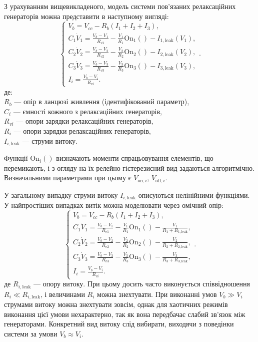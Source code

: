 З урахуванням вищевикладеного, модель системи пов'язаних
релаксаційних генераторів можна представити в наступному
вигляді:
%
\begin{equation}
  \begin{cases}
    V_b = V_{cc} - R_b ( I_1 + I_2 + I_3 ), \\
      C_1 \dot{V}_1 = \frac{V_b-V_1}{R_{v1}} - \frac{V_1}{R_1} \mathrm{On}_1() - I_{1,\mathrm{leak}}(V_1), \\
      C_2 \dot{V}_2 = \frac{V_b-V_2}{R_{v2}} - \frac{V_2}{R_2} \mathrm{On}_2() - I_{2,\mathrm{leak}}(V_2), \\
      C_3 \dot{V}_3 = \frac{V_b-V_3}{R_{v3}} - \frac{V_3}{R_3} \mathrm{On}_3() - I_{3,\mathrm{leak}}(V_3), \\
      I_i = \frac{V_b-V_i}{R_{vi}}.
  \end{cases}.
    \label{atu:eq:relax3}
\end{equation}
%
де: \\
$ R_b $ --- опір в ланцюзі живлення (ідентифікований параметр), \\
$ C_i $ --- ємності кожного з релаксаційних генераторів, \\
$ R_{vi} $ --- опори зарядки релаксаційних генераторів, \\
$ R_{ i} $ --- опори зарядки релаксаційних генераторів, \\
$ I_{i, \mathrm{leak}} $ --- струми витоку.


Функції
$ \mathrm{On}_i() $ визначають моменти спрацьовування  елементів, що перемикають,
і з огляду на їх релейно-гістерезисний вид
задаються алгоритмічно. Визначальними параметрами при цьому є
$ V_{\mathrm{on}, i} $,
$ V_{\mathrm{off}, i} $.

У загальному випадку струми витоку
$ I_{i, \mathrm{leak}} $ описуються нелінійними функціями. У найпростіших
випадках витік можна моделювати через омічний опір:
%
\begin{equation}
  \begin{cases}
    V_b = V_{cc} - R_b ( I_1 + I_2 + I_3 ), \\
      C_1 \dot{V}_1 = \frac{V_b-V_1}{R_{v1}} - \frac{V_1}{R_1} \mathrm{On}_1() - \frac{V_1}{R_1+R_{1,\mathrm{leak}}}, \\
      C_2 \dot{V}_2 = \frac{V_b-V_2}{R_{v2}} - \frac{V_2}{R_2} \mathrm{On}_2() - \frac{V_2}{R_2+R_{2,\mathrm{leak}}}, \\
      C_3 \dot{V}_3 = \frac{V_b-V_3}{R_{v3}} - \frac{V_3}{R_3} \mathrm{On}_3() - \frac{V_3}{R_3+R_{3,\mathrm{leak}}}, \\
      I_i = \frac{V_b-V_i}{R_{vi}}.
  \end{cases}.
    \label{atu:eq:relax3_linleak}
\end{equation}
%
де
$ R_{i, \mathrm{leak}} $ --- опору витоку. При цьому досить часто виконується
співвідношення
$ R_{i} \ll R_{i, \mathrm{leak}} $, і величинами
$ R_{i} $ можна знехтувати. При виконанні умов
$ V_b \gg V_i $ струмами витоку можна знехтувати зовсім, однак для
хаотичних режимів виконання цієї умови нехарактерно, так як
вона передбачає слабий зв'язок між генераторами. Конкретний
вид витоку слід вибирати, виходячи з поведінки системи за умови
$ V_b \approx V_i $.

